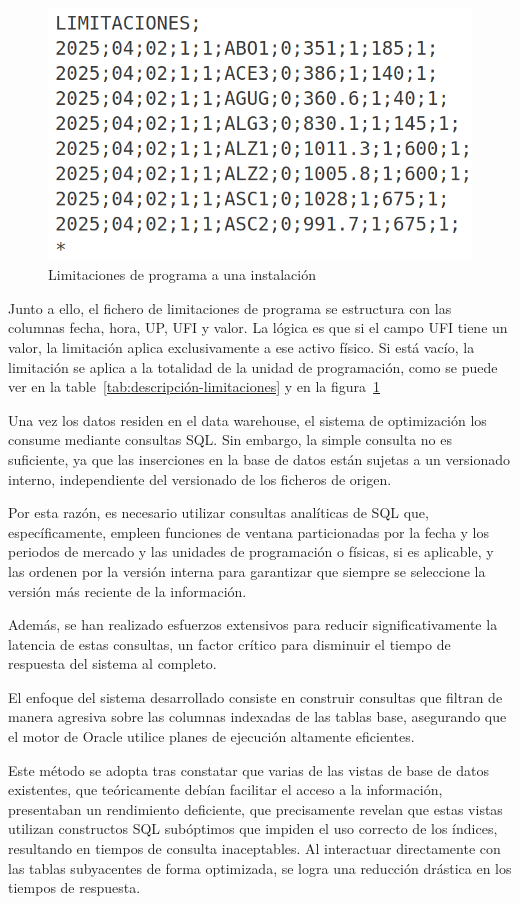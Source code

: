 \begin{figure}
\centering
\includegraphics[width=0.5\linewidth]{figures/contenido-limitaciones.png}
\caption{Limitaciones de programa a una instalación}
\label{fig:contenido-limitaciones}
\end{figure}

Junto a ello, el fichero de limitaciones de programa se estructura con las columnas fecha, hora, UP, UFI y valor. La lógica es que si el campo UFI tiene un valor, la limitación aplica exclusivamente a ese activo físico. Si está vacío, la limitación se aplica a la totalidad de la unidad de programación, como se puede ver en la table~\ref{tab:descripción-limitaciones} y en la figura~\ref{fig:contenido-limitaciones}

Una vez los datos residen en el data warehouse, el sistema de optimización los consume mediante consultas SQL. Sin embargo, la simple consulta no es suficiente, ya que las inserciones en la base de datos están sujetas a un versionado interno, independiente del versionado de los ficheros de origen.

Por esta razón, es necesario utilizar consultas analíticas de SQL que, específicamente, empleen funciones de ventana particionadas por la fecha y los periodos de mercado y las unidades de programación o físicas, si es aplicable, y las ordenen por la versión interna para garantizar que siempre se seleccione la versión más reciente de la información.

Además, se han realizado esfuerzos extensivos para reducir significativamente la latencia de estas consultas, un factor crítico para disminuir el tiempo de respuesta del sistema al completo.

El enfoque del sistema desarrollado consiste en construir consultas que filtran de manera agresiva sobre las columnas indexadas de las tablas base, asegurando que el motor de Oracle utilice planes de ejecución altamente eficientes.

Este método se adopta tras constatar que varias de las vistas de base de datos existentes, que teóricamente debían facilitar el acceso a la información, presentaban un rendimiento deficiente, que precisamente revelan que estas vistas utilizan constructos SQL subóptimos que impiden el uso correcto de los índices, resultando en tiempos de consulta inaceptables. Al interactuar directamente con las tablas subyacentes de forma optimizada, se logra una reducción drástica en los tiempos de respuesta.

